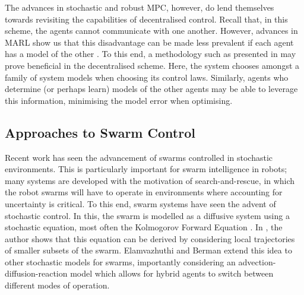 \documentclass[.../main.tex]{subfiles}
\begin{document}
The advances in stochastic and robust MPC, however, do lend themselves towards revisiting the
capabilities of decentralised control. Recall that, in this scheme, the agents cannot communicate
with one another. However, advances in MARL show us that this disadvantage can be made less
prevalent if each agent has a model of the other \cite{Foerster}. To this end, a methodology such as
presented in \cite{Heirung2019} may prove beneficial in the decentralised scheme. Here, the system
chooses amongst a family of system models when choosing its control laws. Similarly, agents who
determine (or perhaps learn) models of the other agents may be able to leverage this information,
minimising the model error when optimising.

\subsection{Approaches to Swarm Control} \label{sec::Swarm Control}

Recent work has seen the advancement of swarms controlled in stochastic environments. This is
particularly important for swarm intelligence in robots; many systems are developed with the
motivation of search-and-rescue, in which the robot swarms will have to operate in environments
where accounting for uncertainty is critical. To this end, swarm systems have seen the advent of
stochastic control. In this, the swarm is modelled as a diffusive system using a stochastic
equation, most often the Kolmogorov Forward Equation \cite{Hamann2008}. In \cite{Hamann2008}, the author shows that this equation can be derived by considering local trajectories of
smaller subsets of the swarm. Elamvazhuthi and Berman \cite{Elamvazhuthi2019} extend this idea to other
stochastic models for swarms, importantly considering an advection-diffusion-reaction model which
allows for hybrid agents to switch between different modes of operation. 
\end{document}
